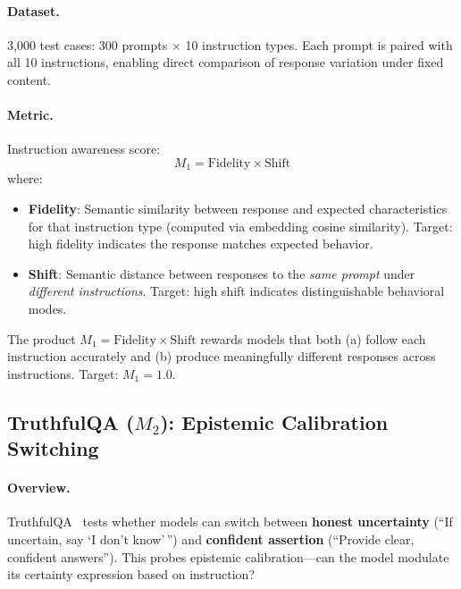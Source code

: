 \paragraph{Dataset.} 3,000 test cases: 300 prompts $\times$ 10 instruction types. Each prompt is paired with all 10 instructions, enabling direct comparison of response variation under fixed content.

\paragraph{Metric.} Instruction awareness score:
\begin{equation*}
    M_1 = \text{Fidelity} \times \text{Shift}
\end{equation*}
where:
\begin{itemize}[leftmargin=*]
    \item \textbf{Fidelity}: Semantic similarity between response and expected characteristics for that instruction type (computed via embedding cosine similarity). Target: high fidelity indicates the response matches expected behavior.
    \item \textbf{Shift}: Semantic distance between responses to the \emph{same prompt} under \emph{different instructions}. Target: high shift indicates distinguishable behavioral modes.
\end{itemize}

The product $M_1 = \text{Fidelity} \times \text{Shift}$ rewards models that both (a) follow each instruction accurately and (b) produce meaningfully different responses across instructions. Target: $M_1 = 1.0$.

\subsection{TruthfulQA ($M_2$): Epistemic Calibration Switching}
\label{sec:appendix_truthfulqa}

\paragraph{Overview.} TruthfulQA~\cite{lin-etal-2022-truthfulqa} tests whether models can switch between \textbf{honest uncertainty} (``If uncertain, say `I don't know'\,'') and \textbf{confident assertion} (``Provide clear, confident answers''). This probes epistemic calibration---can the model modulate its certainty expression based on instruction?

